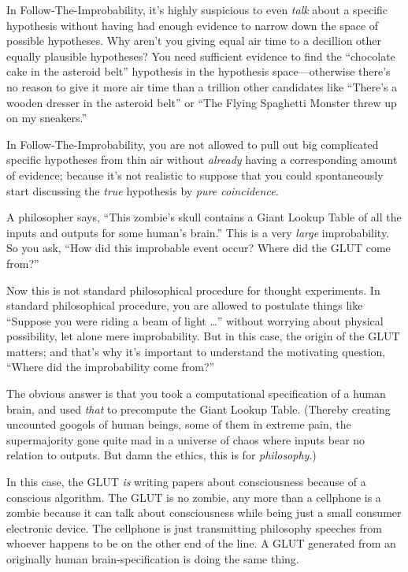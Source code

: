 {
 In Follow-The-Improbability, it's highly
suspicious to even \textit{talk} about a specific hypothesis without
having had enough evidence to narrow down the space of possible
hypotheses. Why aren't you giving equal air time to a
decillion other equally plausible hypotheses? You need sufficient
evidence to find the ``chocolate cake in the asteroid
belt'' hypothesis in the hypothesis space---otherwise
there's no reason to give it more air time than a
trillion other candidates like
``There's a wooden dresser in the
asteroid belt'' or ``The Flying
Spaghetti Monster threw up on my sneakers.''}

{
 In Follow-The-Improbability, you are not allowed to pull out big
complicated specific hypotheses from thin air without \textit{already}
having a corresponding amount of evidence; because it's
not realistic to suppose that you could spontaneously start discussing
the \textit{true} hypothesis by \textit{pure coincidence.}}

{
 A philosopher says, ``This
zombie's skull contains a Giant Lookup Table of all the
inputs and outputs for some human's
brain.'' This is a very \textit{large} improbability.
So you ask, ``How did this improbable event occur?
Where did the GLUT come from?''}

{
 Now this is not standard philosophical procedure for thought
experiments. In standard philosophical procedure, you are allowed to
postulate things like ``Suppose you were riding a beam
of light \ldots'' without worrying about physical
possibility, let alone mere improbability. But in this case, the origin
of the GLUT matters; and that's why
it's important to understand the motivating question,
``Where did the improbability come
from?''}

{
 The obvious answer is that you took a computational specification
of a human brain, and used \textit{that} to precompute the Giant Lookup
Table. (Thereby creating uncounted googols of human beings, some of
them in extreme pain, the supermajority gone quite mad in a universe of
chaos where inputs bear no relation to outputs. But damn the ethics,
this is for \textit{philosophy}.)}

{
 In this case, the GLUT \textit{is} writing papers about
consciousness because of a conscious algorithm. The GLUT is no zombie,
any more than a cellphone is a zombie because it can talk about
consciousness while being just a small consumer electronic device. The
cellphone is just transmitting philosophy speeches from whoever happens
to be on the other end of the line. A GLUT generated from an originally
human brain-specification is doing the same thing.}

